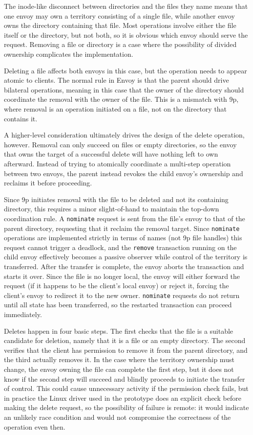 The inode-like disconnect between directories and the files they name means that one envoy may own a territory consisting of a single file, while another envoy owns the directory containing that file. Most operations involve either the file itself or the directory, but not both, so it is obvious which envoy should serve the request. Removing a file or directory is a case where the possibility of divided ownership complicates the implementation.

Deleting a file affects both envoys in this case, but the operation needs to appear atomic to clients. The normal rule in Envoy is that the parent should drive bilateral operations, meaning in this case that the owner of the directory should coordinate the removal with the owner of the file. This is a mismatch with 9p, where removal is an operation initiated on a file, not on the directory that contains it.

A higher-level consideration ultimately drives the design of the delete operation, however. Removal can only succeed on files or empty directories, so the envoy that owns the target of a successful delete will have nothing left to own afterward. Instead of trying to atomically coordinate a multi-step operation between two envoys, the parent instead revokes the child envoy's ownership and reclaims it before proceeding.

Since 9p initiates removal with the file to be deleted and not its containing directory, this requires a minor slight-of-hand to maintain the top-down coordination rule. A \texttt{nominate} request is sent from the file's envoy to that of the parent directory, requesting that it reclaim the removal target. Since \texttt{nominate} operations are implemented strictly in terms of names (not 9p file handles) this request cannot trigger a deadlock, and the \texttt{remove} transaction running on the child envoy effectively becomes a passive observer while control of the territory is transferred. After the transfer is complete, the envoy aborts the transaction and starts it over. Since the file is no longer local, the envoy will either forward the request (if it happens to be the client's local envoy) or reject it, forcing the client's envoy to redirect it to the new owner. \texttt{nominate} requests do not return until all state has been transferred, so the restarted transaction can proceed immediately.

Deletes happen in four basic steps. The first checks that the file is a suitable candidate for deletion, namely that it is a file or an empty directory. The second verifies that the client has permission to remove it from the parent directory, and the third actually removes it. In the case where the territory ownership must change, the envoy owning the file can complete the first step, but it does not know if the second step will succeed and blindly proceeds to initiate the transfer of control. This could cause unnecessary activity if the permission check fails, but in practice the Linux driver used in the prototype does an explicit check before making the delete request, so the possibility of failure is remote: it would indicate an unlikely race condition and would not compromise the correctness of the operation even then.

